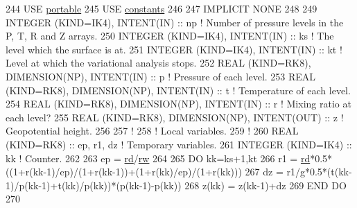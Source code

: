\begin{DoxyCode}
244 \textcolor{keywordtype}{USE }\hyperlink{namespaceportable}{portable}
245 \textcolor{keywordtype}{USE }\hyperlink{namespaceconstants}{constants}
246 
247 \textcolor{keywordtype}{IMPLICIT NONE}
248 
249 \textcolor{keywordtype}{INTEGER (KIND=IK4)}, \textcolor{keywordtype}{INTENT(IN)}                :: np         \textcolor{comment}{! Number of pressure levels in the P, T, R and
       Z arrays.}
250 \textcolor{keywordtype}{INTEGER (KIND=IK4)}, \textcolor{keywordtype}{INTENT(IN)}                :: ks         \textcolor{comment}{! The level which the surface is at.}
251 \textcolor{keywordtype}{INTEGER (KIND=IK4)}, \textcolor{keywordtype}{INTENT(IN)}                :: kt         \textcolor{comment}{! Level at which the variational analysis
       stops.}
252 \textcolor{keywordtype}{REAL (KIND=RK8)}, \textcolor{keywordtype}{DIMENSION(NP)}, \textcolor{keywordtype}{INTENT(IN)}    :: p          \textcolor{comment}{! Pressure of each level.}
253 \textcolor{keywordtype}{REAL (KIND=RK8)}, \textcolor{keywordtype}{DIMENSION(NP)}, \textcolor{keywordtype}{INTENT(IN)}    :: t          \textcolor{comment}{! Temperature of each level.}
254 \textcolor{keywordtype}{REAL (KIND=RK8)}, \textcolor{keywordtype}{DIMENSION(NP)}, \textcolor{keywordtype}{INTENT(IN)}    :: r          \textcolor{comment}{! Mixing ratio at each level?}
255 \textcolor{keywordtype}{REAL (KIND=RK8)}, \textcolor{keywordtype}{DIMENSION(NP)}, \textcolor{keywordtype}{INTENT(OUT)}   :: z          \textcolor{comment}{! Geopotential height.}
256 
257 \textcolor{comment}{!}
258 \textcolor{comment}{! Local variables.}
259 \textcolor{comment}{!}
260 \textcolor{keywordtype}{REAL (KIND=RK8)}                               :: ep, r1, dz \textcolor{comment}{! Temporary variables.}
261 \textcolor{keywordtype}{INTEGER (KIND=IK4)}                            :: kk         \textcolor{comment}{! Counter.}
262 
263 ep  = \hyperlink{namespaceconstants_ad91564da82b97ea0d29ce0565565db85}{rd}/\hyperlink{namespaceconstants_a7ef8fc37397fbfbefd3c22883378dcc5}{rw}
264 
265 \textcolor{keywordflow}{DO} kk=ks+1,kt
266     r1      = \hyperlink{namespaceconstants_ad91564da82b97ea0d29ce0565565db85}{rd}*0.5*((1+r(kk-1)/ep)/(1+r(kk-1))+(1+r(kk)/ep)/(1+r(kk)))
267     dz      = r1/\hyperlink{namespaceconstants_a046aef138fbc8d05251d4fdc6eb3ee89}{g}*0.5*(t(kk-1)/p(kk-1)+t(kk)/p(kk))*(p(kk-1)-p(kk))
268     z(kk)   = z(kk-1)+dz
269 \textcolor{keywordflow}{END DO}
270 
\end{DoxyCode}


